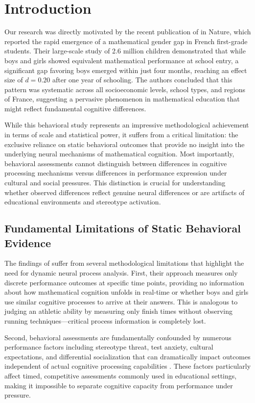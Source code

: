 \documentclass[pdflatex,sn-nature]{sn-jnl}%
\theoremstyle{thmstyleone}%
\theoremstyle{thmstyletwo}%
\theoremstyle{thmstylethree}%
\begin{document}
\section{Introduction}\label{sec1}
Our research was directly motivated by the recent publication of \cite{martinot2025mathematical} in Nature, which reported the rapid emergence of a mathematical gender gap in French first-grade students. Their large-scale study of 2.6 million children demonstrated that while boys and girls showed equivalent mathematical performance at school entry, a significant gap favoring boys emerged within just four months, reaching an effect size of $d = 0.20$ after one year of schooling. The authors concluded that this pattern was systematic across all socioeconomic levels, school types, and regions of France, suggesting a pervasive phenomenon in mathematical education that might reflect fundamental cognitive differences.

While this behavioral study represents an impressive methodological achievement in terms of scale and statistical power, it suffers from a critical limitation: the exclusive reliance on static behavioral outcomes that provide no insight into the underlying neural mechanisms of mathematical cognition. Most importantly, behavioral assessments cannot distinguish between differences in cognitive processing mechanisms versus differences in performance expression under cultural and social pressures. This distinction is crucial for understanding whether observed differences reflect genuine neural differences or are artifacts of educational environments and stereotype activation.

\subsection{Fundamental Limitations of Static Behavioral Evidence}
The findings of \cite{martinot2025mathematical} suffer from several methodological limitations that highlight the need for dynamic neural process analysis. First, their approach measures only discrete performance outcomes at specific time points, providing no information about how mathematical cognition unfolds in real-time or whether boys and girls use similar cognitive processes to arrive at their answers. This is analogous to judging an athletic ability by measuring only finish times without observing running techniques—critical process information is completely lost.

Second, behavioral assessments are fundamentally confounded by numerous performance factors including stereotype threat, test anxiety, cultural expectations, and differential socialization that can dramatically impact outcomes independent of actual cognitive processing capabilities \cite{spencer1999stereotype,schmader2008threat}. These factors particularly affect timed, competitive assessments commonly used in educational settings, making it impossible to separate cognitive capacity from performance under pressure.
\end{document}
